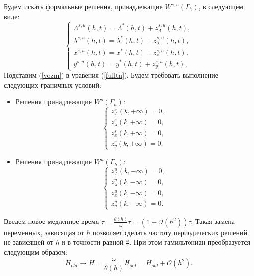 Будем искать формальные решения, принадлежащие $W^{s,u}(\Gamma_h)$, в следующем виде:
\begin{equation}
    \begin{cases}
        \Lambda^{s,u}(h,t) = \Lambda^*(h,t) + z^{s,u}_\Lambda(h,t), \\
        \lambda^{s,u}(h,t) = \lambda^*(h,t) + z^{s,u}_\lambda(h,t),\\
        x^{s,u}(h,t) = x^*(h,t) + z_x^{s,u}(h,t), \\
        y^{s,u}(h,t) = y^*(h,t) + z_y^{s,u}(h,t),
    \end{cases}
    \label{vozm}
\end{equation}
Подставим (\ref{vozm}) в уравения (\ref{fulltn}). Будем требовать выполнение следующих граничных условий:
\begin{itemize}
\item Решения принадлежащие $W^s(\Gamma_h)$:
\begin{equation*}
    \begin{cases}
        z_\Lambda^{s}(k,+ \infty) = 0, \\
        z_\lambda^{s}(k,+ \infty) = 0,\\
        z_x^{s}(k,+ \infty) = 0, \\
        z_y^{s}(k,+ \infty) = 0.
    \end{cases}
    \label{border2}
\end{equation*}
\item Решения принадлежащие $W^u(\Gamma_h)$:
\begin{equation*}
    \begin{cases}
        z_\Lambda^{u}(k,- \infty) = 0, \\
        z_\lambda^{u}(k,- \infty) = 0,\\
        z_x^{u}(k,- \infty) = 0, \\
        z_y^{u}(k,- \infty) = 0.
    \end{cases}
    \label{border3}
\end{equation*} 
\end{itemize}


Введем новое медленное время $\tilde \tau = \frac{\theta(h)}{\omega} \tau = (1+\mathcal{O}(h^2))\tau$. Такая замена переменных, зависящая от $h$ позволяет сделать частоту периодических решений не зависящей от $h$ и в точности равной $\frac{\omega}{\varepsilon}$. При этом гамильтониан преобразуется следующим образом:
$$H_{old} \to H = \frac{\omega}{\theta(h)}H_{old}= H_{old} + \mathcal{O}(h^2).$$

